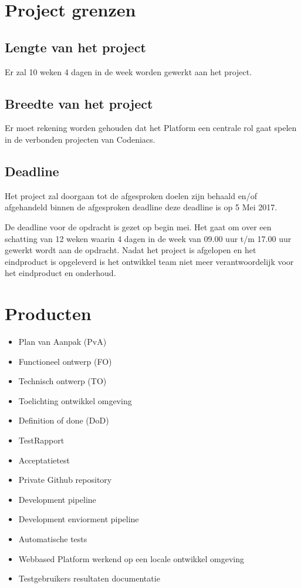 \documentclass[]{report}
\begin{document}
\chapter{Project grenzen}

\section{Lengte van het project}
Er zal 10 weken 4 dagen in de week worden gewerkt aan het project.

\section{Breedte van het project}
Er moet rekening worden gehouden dat het Platform een centrale rol gaat spelen in de verbonden projecten van Codeniacs.

\section{Deadline}
Het project zal doorgaan tot de afgesproken doelen zijn behaald en/of afgehandeld binnen de afgesproken deadline deze deadline is op 5 Mei 2017.

De deadline voor de opdracht is gezet op begin mei. Het gaat om over een schatting van 12 weken waarin 4 dagen in de week van 09.00 uur t/m 17.00 uur gewerkt wordt aan de opdracht. Nadat het project is afgelopen en het eindproduct is opgeleverd is het ontwikkel team niet meer verantwoordelijk voor het eindproduct en onderhoud.





\chapter{Producten}

\begin{itemize}
	\item Plan van Aanpak (PvA)
	\item Functioneel ontwerp (FO)
	\item Technisch ontwerp (TO)
	\item Toelichting ontwikkel omgeving
	\item Definition of done (DoD)
	\item TestRapport 
	\item Acceptatietest
		\newline
	\item Private Github repository
	\item Development pipeline 
	\item Development enviorment pipeline
	\item Automatische tests
	\item Webbased Platform werkend op een locale ontwikkel omgeving
		\newline
	\item Testgebruikers resultaten documentatie
		\newline
\end{itemize} 
\end{document}
